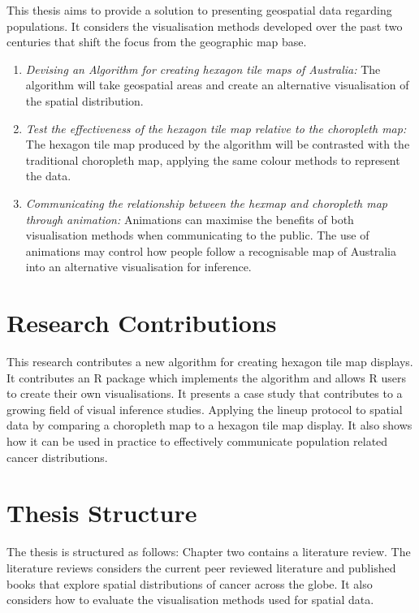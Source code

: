 \documentclass{monashthesis}
\begin{document}
This thesis aims to provide a solution to presenting geospatial data regarding populations.
It considers the visualisation methods developed over the past two centuries that shift the focus from the geographic map base.

\begin{enumerate}
\def\labelenumi{\arabic{enumi}.}
\item
  \emph{Devising an Algorithm for creating hexagon tile maps of Australia:} The algorithm will take geospatial areas and create an alternative visualisation of the spatial distribution.
\item
  \emph{Test the effectiveness of the hexagon tile map relative to the choropleth map:} The hexagon tile map produced by the algorithm will be contrasted with the traditional choropleth map, applying the same colour methods to represent the data.
\item
  \emph{Communicating the relationship between the hexmap and choropleth map through animation:} Animations can maximise the benefits of both visualisation methods when communicating to the public. The use of animations may control how people follow a recognisable map of Australia into an alternative visualisation for inference.
\end{enumerate}

\hypertarget{research-contributions}{%
\section{Research Contributions}\label{research-contributions}}

This research contributes a new algorithm for creating hexagon tile map displays. It contributes an R \autocite{R} package which implements the algorithm and allows R users to create their own visualisations.
It presents a case study that contributes to a growing field of visual inference studies. Applying the lineup protocol to spatial data by comparing a choropleth map to a hexagon tile map display.
It also shows how it can be used in practice to effectively communicate population related cancer distributions.

\hypertarget{thesis-structure}{%
\section{Thesis Structure}\label{thesis-structure}}

The thesis is structured as follows: Chapter two contains a literature review.
The literature reviews considers the current peer reviewed literature and published books that explore spatial distributions of cancer across the globe.
It also considers how to evaluate the visualisation methods used for spatial data.
\end{document}
